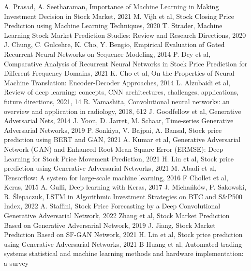 \documentclass[11pt]{article} %
\begin{document}
\begin{thebibliography}{9}
A. Prasad, A. Seetharaman, Importance of Machine Learning in Making Investment Decision in Stock Market, 2021
M. Vijh et al, Stock Closing Price Prediction using Machine Learning Techniques, 2020
T. Strader, Machine Learning Stock Market Prediction Studies: Review and Research Directions, 2020
J. Chung, C. Gulcehre, K. Cho, Y. Bengio, Empirical Evaluation of Gated Recurrent Neural Networks on Sequence Modeling, 2014
P. Dey et al, Comparative Analysis of Recurrent Neural Networks in Stock Price Prediction for Different Frequency Domains, 2021 
K. Cho et al, On the Properties of Neural Machine Translation: Encoder-Decoder Approaches, 2014
L. Alzubaidi et al, Review of deep learning: concepts, CNN architectures, challenges, applications, future directions, 2021, 14
R. Yamashita, Convolutional neural networks: an overview and application in radiology, 2018, 612
J. Goodfellow et al, Generative Adversarial Nets, 2014
J. Yoon, D. Jarret, M. Schaar, Time-series Generative Adversarial Networks, 2019
P. Sonkiya, V. Bajpai, A. Bansal, Stock price prediction using BERT and GAN, 2021
A. Kumar et al, Generative Adversarial Network (GAN) and Enhanced Root Mean Square Error (ERMSE): Deep Learning for Stock Price Movement Prediction, 2021
H. Lin et al, Stock price prediction using Generative Adversarial Networks, 2021 
M. Abadi et al, Tensorflow: A system for large-scale machine learning, 2016
F Chollet et al, Keras, 2015
A. Gulli,  Deep learning with Keras, 2017
J. Michańków, P. Sakowski, R. Ślepaczuk, LSTM in Algorithmic Investment Strategies on BTC and S\&P500 Index, 2022
A. Staffini, Stock Price Forecasting by a Deep Convolutional Generative Adversarial Network, 2022
Zhang et al, Stock Market Prediction Based on Generative Adversarial Network, 2019
J. Jiang, Stock Market Prediction Based on SF-GAN Network, 2021
H. Lin et al, Stock price prediction using Generative Adversarial Networks, 2021
\cite{at}
B Huang et al, Automated trading systems statistical and machine learning methods and hardware implementation: a survey

\end{thebibliography}
\end{document}

